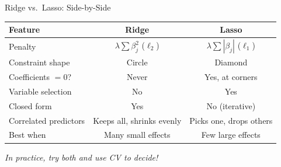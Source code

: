 \documentclass[aspectratio=169, 11pt]{beamer}
\begin{document}
\begin{frame}{Ridge vs.\ Lasso: Side-by-Side}
\begin{center}
\begin{tabular}{lcc}
\toprule
Feature & Ridge & Lasso \\
\midrule
Penalty & $\lambda \sum \beta_j^2$ ($\ell_2$) & $\lambda \sum |\beta_j|$ ($\ell_1$) \\
Constraint shape & Circle & Diamond \\
Coefficients $= 0$? & \textcolor{softred}{Never} & \textcolor{softgreen}{Yes, at corners} \\
Variable selection & No & \textcolor{softgreen}{Yes} \\
Closed form & Yes & No (iterative) \\
Correlated predictors & Keeps all, shrinks evenly & Picks one, drops others \\
Best when & Many small effects & Few large effects \\
\bottomrule
\end{tabular}
\end{center}
\vspace{0.5em}
\centering
\textit{In practice, try both and use CV to decide!}
\end{frame}
\end{document}
